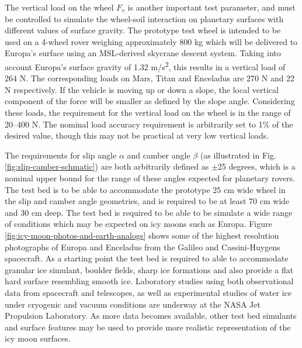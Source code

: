 \documentclass{article}
\begin{document}
The vertical load on the wheel $F_v$ is another important test parameter, and must be controlled to simulate the wheel-soil interaction on planetary surfaces with different values of surface gravity. The prototype test wheel is intended to be used on a 4-wheel rover weighing approximately 800 kg which will be delivered to Europa's surface using an MSL-derived skycrane descent system. Taking into account Europa's surface gravity of 1.32 m/s\textsuperscript{2}, this results in a vertical load of 264 N. The corresponding loads on Mars, Titan and Enceladus are 270 N and 22 N respectively. If the vehicle is moving up or down a slope, the local vertical component of the force will be smaller as defined by the slope angle.  Considering these loads, the requirement for the vertical load on the wheel is in the range of 20--400 N. The nominal  load accuracy requirement is arbitrarily set to 1\% of the desired value, though this may not be practical at very low vertical loads. 

The requirements for slip angle $\alpha$ and camber angle $\beta$ (as illustrated in Fig. \ref{fig:slip-camber-schmatic}) are both arbitrarily defined as $\pm$25 degrees, which is a nominal upper bound for the range of these angles expected for planetary rovers. The test bed is to be able to accommodate the prototype 25 cm wide wheel in the slip and camber angle geometries, and is required to be at least 70 cm wide and 30 cm deep. The test bed is required to be able to be simulate a wide range of conditions which may be expected on icy moons such as Europa. Figure \ref{fig:icy-moon-photos-and-earth-analogs} shows some of the highest resolution photographs of Europa and Enceladus from the Galileo and Cassini-Huygens spacecraft. As a starting point the test bed is required to able to accommodate granular ice simulant, boulder fields, sharp ice formations and also provide a flat hard surface resembling smooth ice. Laboratory studies using both observational data from spacecraft and telescopes, as well as experimental studies of water ice under cryogenic and  vacuum conditions are underway at the NASA Jet Propulsion Laboratory.  As more data becomes available, other test bed simulants and surface features may be used to provide more realistic representation of the icy moon surfaces. 
\end{document}
